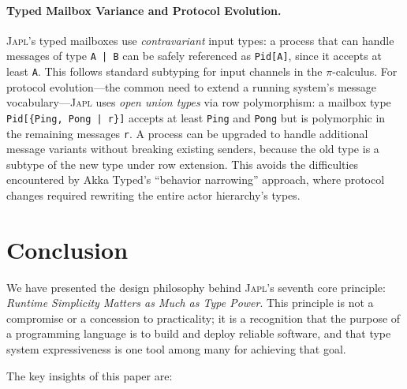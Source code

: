 \documentclass[11pt,twocolumn]{article}
\newcommand{\japl}{\textsc{Japl}}
\begin{document}
\paragraph{Typed Mailbox Variance and Protocol Evolution.}
\japl{}'s typed mailboxes use \emph{contravariant} input types: a process that can handle messages of type \texttt{A | B} can be safely referenced as \texttt{Pid[A]}, since it accepts at least \texttt{A}.
This follows standard subtyping for input channels in the $\pi$-calculus.
For protocol evolution---the common need to extend a running system's message vocabulary---\japl{} uses \emph{open union types} via row polymorphism: a mailbox type \texttt{Pid[\{Ping, Pong | r\}]} accepts at least \texttt{Ping} and \texttt{Pong} but is polymorphic in the remaining messages \texttt{r}.
A process can be upgraded to handle additional message variants without breaking existing senders, because the old type is a subtype of the new type under row extension.
This avoids the difficulties encountered by Akka Typed's ``behavior narrowing'' approach, where protocol changes required rewriting the entire actor hierarchy's types.

\section{Conclusion}
\label{sec:conclusion}

We have presented the design philosophy behind \japl{}'s seventh core principle: \emph{Runtime Simplicity Matters as Much as Type Power}.
This principle is not a compromise or a concession to practicality; it is a recognition that the purpose of a programming language is to build and deploy reliable software, and that type system expressiveness is one tool among many for achieving that goal.

The key insights of this paper are:
\end{document}
